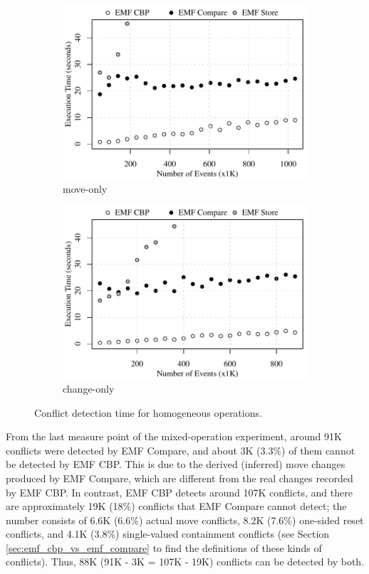 \begin{figure}[ht]
\begin{subfigure}[t]{0.490\linewidth}
	\includegraphics[width=\linewidth]{move-conflict-time-events}
	\caption{move-only}
	\label{fig:move-conflict-time-events}
\end{subfigure}
\hfill
\begin{subfigure}[t]{0.490\linewidth}
	\includegraphics[width=\linewidth]{change-conflict-time-events}
	\caption{change-only}
	\label{fig:change-conflict-time-events}
\end{subfigure}
\caption{Conflict detection time for homogeneous operations.}
\label{fig:homgeneous_operation_time_events}
\end{figure}

From the last measure point of the mixed-operation experiment, around 91K conflicts were detected by EMF Compare, and about 3K (3.3\%) of them cannot be detected by EMF CBP. This is due to the derived (inferred) move changes produced by EMF Compare, which are different from the real changes recorded by EMF CBP. In contrast, EMF CBP detects around 107K conflicts, and there are approximately 19K (18\%) conflicts that EMF Compare cannot detect; the number consists of 6.6K (6.6\%) actual move conflicts, 8.2K (7.6\%) one-sided reset conflicts, and 4.1K (3.8\%) single-valued containment conflicts (see Section \ref{sec:emf_cbp_vs_emf_compare} to find the definitions of these kinds of conflicts). Thus, 88K (91K - 3K = 107K - 19K) conflicts can be detected by both.

